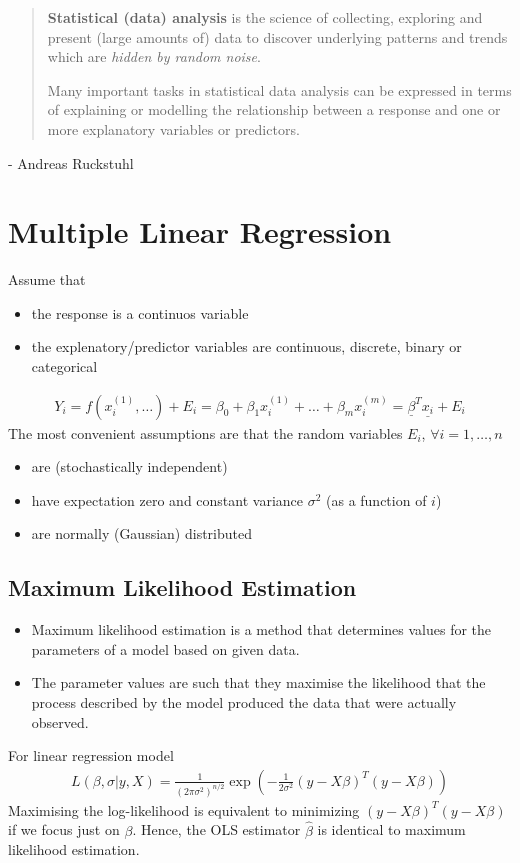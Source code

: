 \begin{quote}
\textbf{Statistical (data) analysis} is the science of collecting,
exploring and present (large amounts of) data
to discover underlying patterns
and trends which are \textit{hidden by random noise}.

Many important tasks in statistical data analysis can be expressed
in terms of explaining or modelling the relationship between a response
and one or more explanatory variables or predictors.
\end{quote}
\hfill - Andreas Ruckstuhl
\section{Multiple Linear Regression}
Assume that
\begin{itemize}
\item the response is a continuos variable
\item the explenatory/predictor variables are continuous,
discrete, binary or categorical
\end{itemize}
\begin{align*}
Y_i
=
f(x_i^{(1)},\ldots) + E_i
=
\beta_0 + \beta_1 x_i^{(1)} + \ldots + \beta_m x_i^{(m)}
= \underline{\beta}^T \underline{x_i} + E_i
\end{align*}
The most convenient assumptions are that the random variables $E_i$,
$\forall i=1,\ldots,n$
\begin{itemize}
\item are (stochastically independent)
\item have expectation zero and constant variance $\sigma^2$
(as a function of $i$)
\item are normally (Gaussian) distributed
\end{itemize}

\subsection{Maximum Likelihood Estimation}
\begin{itemize}
\item Maximum likelihood estimation is a method that determines values
for the parameters of a model based on given data.
\item The parameter values are such that they maximise the likelihood that
the process described by the model produced the data that were
actually observed.
\end{itemize}
For linear regression model
\begin{align*}
L(\beta, \sigma | y, X)
=
\frac{1}{(2\pi\sigma^2)^{n/2}}
\exp\left(-\frac{1}{2\sigma^2}(y-X\beta)^T(y-X\beta)\right)
\end{align*}
Maximising the log-likelihood is equivalent to minimizing
$(y-X\beta)^T(y-X\beta)$ if we focus just on $\beta$.
Hence, the OLS estimator $\widehat{\beta}$ is identical to maximum likelihood
estimation.


